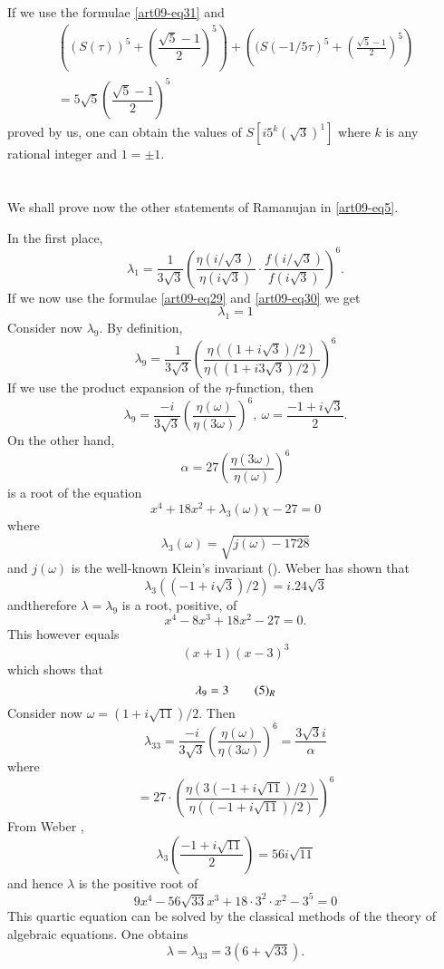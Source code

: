 If we use the formulae \eqref{art09-eq31} and
\begin{equation}
\begin{array}{c}
\left((S(\tau))^{5}+\left(\dfrac{\sqrt{5}-1}{2}\right)^{5}\right)+\left((S(-1/5\tau)^{5}+\left(\frac{\sqrt{5}-1}{2}\right)^{5}\right)\\
=5\sqrt{5}\left(\dfrac{\sqrt{5}-1}{2}\right)^{5}
\end{array}\label{art09-eq32}
\end{equation}
proved by us, one can obtain the values of $S[i5^{k}(\sqrt{3})^{1}]$ where $k$ is any rational integer and $1=\pm 1$.

\section{}\label{art09-sec4}
We shall prove now the other statements of Ramanujan in \eqref{art09-eq5}. 

In the first place,
$$
\lambda_{1}=\dfrac{1}{3\sqrt{3}}\left(\frac{\eta(i/\sqrt{3})}{\eta(i\sqrt{3})}\cdot \frac{f(i/\sqrt{3})}{f(i\sqrt{3})}\right)^{6}.
$$
If we now use the formulae \eqref{art09-eq29} and \eqref{art09-eq30} we get
$$
\lambda_{1}=1
$$
Consider now $\lambda_{9}$. By definition,
$$
\lambda_{9}=\frac{1}{3\sqrt{3}}\left(\frac{\eta((1+i\sqrt{3})/2)}{\eta((1+i3\sqrt{3})/2)}\right)^{6}
$$
If we use the product expansion of the $\eta$-function, then
\begin{equation}
\lambda_{9}=\dfrac{-i}{3\sqrt{3}}\left(\frac{\eta(\omega)}{\eta(3\omega)}\right)^{6}, \ \omega=\dfrac{-1+i\sqrt{3}}{2}.\label{art09-eq33}
\end{equation}
On the other hand,
$$
\alpha = 27 \left(\dfrac{\eta(3\omega)}{\eta(\omega)}\right)^{6}
$$
is a root of the equation
$$
x^{4}+18x^{2}+\lambda_{3}(\omega)\chi-27=0
$$
where
$$
\lambda_{3}(\omega)=\sqrt{j(\omega)-1728}
$$
and $j(\omega)$ is the well-known Klein's invariant (\cite[p. 504]{art09-key9}). Weber has shown that
$$
\lambda_{3}((-1+i\sqrt{3})/2)=i.24\sqrt{3}
$$
and\pageoriginale therefore $\lambda=\lambda_{9}$ is a root, positive, of
$$
x^{4}-8x^{3}+18x^{2}-27=0.
$$
This however equals
$$
(x+1)(x-3)^{3}
$$
which shows that
\begin{equation*}
\lambda_{9}=3\tag*{(5)$_{R}$}\label{art09-aaddeq5R}
\end{equation*}
Consider now $\omega=(1+i\sqrt{11})/2$. Then
$$
\lambda_{33}=\frac{-i}{3\sqrt{3}}\left(\frac{\eta(\omega)}{\eta(3\omega)}\right)^{6}=\dfrac{3\sqrt{3}i}{\alpha}
$$
where
$$
=27\cdot \left(\frac{\eta(3(-1+i\sqrt{11})/2)}{\eta((-1+i\sqrt{11})/2)}\right)^{6}
$$
From Weber \cite[p. 504]{art09-key9},
$$
\lambda_{3}\left(\frac{-1+i\sqrt{11}}{2}\right)=56i\sqrt{11}
$$
and hence $\lambda$ is the positive root of
\begin{equation}
9x^{4}-56\sqrt{33}x^{3}+18\cdot 3^{2}\cdot x^{2}-3^{5}=0\label{art09-eq34}
\end{equation}
This quartic equation can be solved by the classical methods of the theory of algebraic equations. One obtains
$$
\lambda=\lambda_{33}=3(6+\sqrt{33}).
$$

